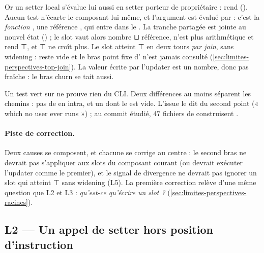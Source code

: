 
Or un setter local s'évalue lui aussi en setter porteur de propriétaire :  rend  (). Aucun test  n'écarte le composant lui-même, et l'argument est évalué par  : c'est la \emph{fonction} , une référence , qui entre dans le . La tranche partagée est jointe au nouvel état () ; le slot vaut alors nombre ⊔ référence,  n'est plus arithmétique et rend ⊤, et ⊤ ne croît plus. Le slot atteint ⊤ en deux tours \emph{par join}, sans widening :  reste vide et le bras point fixe d' n'est jamais consulté (\cref{sec:limites-perspectives-top-join}). La valeur écrite par l'updater est un nombre, donc pas fraîche : le bras churn se tait aussi.

\begin{piege}
Un test vert sur  ne prouve rien du CLI. Deux différences au moins séparent les chemins : pas de  en intra, et un  dont le  est vide. L'issue  le dit du second point (« which no user ever runs ») ; au commit étudié, 47 fichiers de  construisent .
\end{piege}

\paragraph{Piste de correction.} Deux causes se composent, et chacune se corrige au centre : le second bras ne devrait pas s'appliquer aux slots du composant courant (ou devrait exécuter l'updater comme le premier), et le signal de divergence ne devrait pas ignorer un slot qui atteint ⊤ sans widening (L5). La première correction relève d'une même question que L2 et L3 : \emph{qu'est-ce qu'écrire un slot ?} (\cref{sec:limites-perspectives-racines}).

\subsection{L2 --- Un appel de setter hors position d'instruction}

